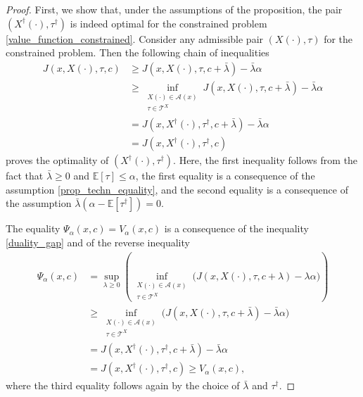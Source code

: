 \documentclass[10pt,a4paper]{amsart}
\newcommand{\ex}{\mathbb{E}}
\begin{document}
\begin{proof}
    First, we show that, under the assumptions of the proposition, the pair $(X^\dag(\cdot), \tau^\dag)$ is indeed optimal for the constrained problem \eqref{value_function_constrained}. Consider any admissible pair $(X(\cdot), \tau)$ for the constrained problem. Then the following chain of inequalities
    \begin{equation}
        \begin{split}
            J\left(x, X(\cdot), \tau, c\right)
            &\ge 
            J\left(x, X(\cdot), \tau, c + \bar{\lambda}\right) - \bar{\lambda} \alpha
            \\&\ge
            \inf\limits_{\substack{X(\cdot) \in \mathcal{A}(x) \\ \tau \in \mathcal{T}^X}} 
            J\left(x, X(\cdot), \tau, c + \bar{\lambda}\right) - \bar{\lambda} \alpha
            \\&=
            J\left(x, X^\dag(\cdot), \tau^\dag, c +\bar{\lambda}\right) - \bar{\lambda} \alpha
            \\&=
            J\left(x, X^\dag(\cdot), \tau^\dag, c\right)
        \end{split}
    \end{equation}
    proves the optimality of $(X^\dag(\cdot), \tau^\dag)$.
    Here, the first inequality follows from the fact that $\bar{\lambda} \ge 0$ and $\ex[\tau] \le \alpha$, the first equality is a consequence of the assumption \eqref{prop_techn_equality}, and the second equality is a consequence of the assumption $\bar{\lambda}(\alpha - \ex[\tau^\dag]) = 0$.

    The equality $\Psi_\alpha(x, c) = V_\alpha(x, c)$ is a consequence of the inequality \eqref{duality_gap} and of the reverse inequality
    \begin{equation}
    \begin{split}
        \Psi_\alpha(x, c) 
        &= 
        \sup_{\lambda \ge 0}
        \left(
        \inf\limits_{\substack{X(\cdot) \in \mathcal{A}(x) \\ \tau \in \mathcal{T}^X}} \Big(
            J(x, X(\cdot), \tau, c + \lambda) - \lambda \alpha 
        \Big)
        \right)
        \\&\ge
        \inf\limits_{\substack{X(\cdot) \in \mathcal{A}(x) \\ \tau \in \mathcal{T}^X}} \Big(
            J(x, X(\cdot), \tau, c + \bar{\lambda}) - \bar{\lambda} \alpha 
        \Big)
        \\&=
        J(x, X^\dag(\cdot), \tau^\dag, c + \bar{\lambda}) - \bar{\lambda} \alpha
        \\&=
        J(x, X^\dag(\cdot), \tau^\dag, c)
        \ge
        V_\alpha(x, c),
    \end{split}
    \end{equation}
    where the third equality follows again by the choice of $\bar{\lambda}$ and $\tau^\dag$.
\end{proof}
\end{document}
